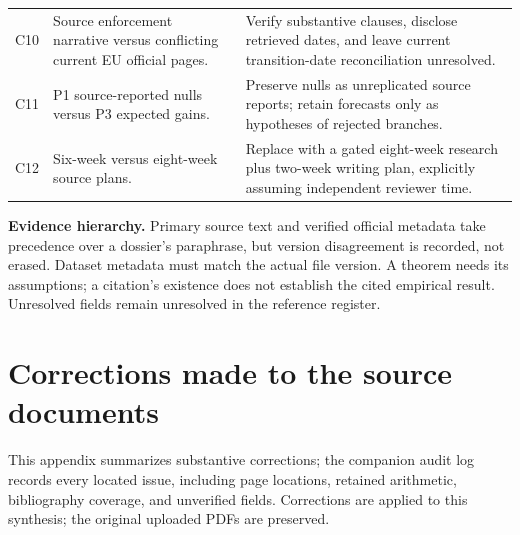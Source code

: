\documentclass[11pt,a4paper]{article}
\newcommand{\pbreak}{\clearpage}
\newcommand{\lead}[1]{\textbf{\color{navy}#1}}
\begin{document}
\begin{table}[H]
\begin{tabularx}{\linewidth}{p{.08\linewidth}YY}
C10 & Source enforcement narrative versus conflicting current EU official pages. & Verify substantive clauses, disclose retrieved dates, and leave current transition-date reconciliation unresolved.\\
C11 & P1 source-reported nulls versus P3 expected gains. & Preserve nulls as unreplicated source reports; retain forecasts only as hypotheses of rejected branches.\\
C12 & Six-week versus eight-week source plans. & Replace with a gated eight-week research plus two-week writing plan, explicitly assuming independent reviewer time.\\\bottomrule
\end{tabularx}\end{table}

\lead{Evidence hierarchy.} Primary source text and verified official metadata take precedence over a dossier's paraphrase, but version disagreement is recorded, not erased. Dataset metadata must match the actual file version. A theorem needs its assumptions; a citation's existence does not establish the cited empirical result. Unresolved fields remain unresolved in the reference register.

\pbreak
\section{Corrections made to the source documents}
This appendix summarizes substantive corrections; the companion audit log records every located issue, including page locations, retained arithmetic, bibliography coverage, and unverified fields. Corrections are applied to this synthesis; the original uploaded PDFs are preserved.
\end{document}
